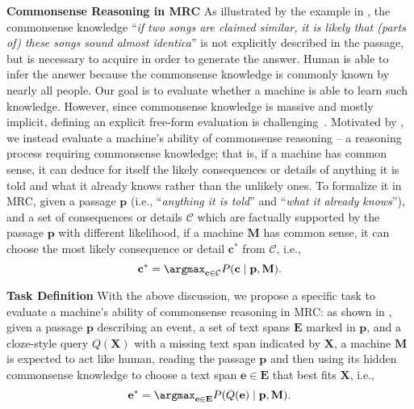 \noindent\textbf{Commonsense Reasoning in MRC}
As illustrated by the example in , the commonsense knowledge ``\emph{if two songs are claimed similar, it is likely that (parts of) these songs sound almost identica}'' is not explicitly described in the passage, but is necessary to acquire in order to generate the answer.
Human is able to infer the answer because the commonsense knowledge is commonly known by nearly all people.
Our goal is to evaluate whether a machine is able to learn such knowledge.
However, since commonsense knowledge is massive and mostly implicit, defining an explicit free-form evaluation is challenging~\cite{wsc}.
Motivated by , we instead evaluate a machine's ability of commonsense reasoning -- a reasoning process requiring commonsense knowledge; that is, if a machine has common sense, it can deduce for itself the likely consequences or details of anything it is told and what it already knows rather than the unlikely ones.
To formalize it in MRC, given a passage $\mathbf{p}$ (i.e., ``\emph{anything it is told}'' and ``\emph{what it already knows}''),
and a set of consequences or details $\mathcal{C}$ which are factually supported by the passage $\mathbf{p}$ with different likelihood,
if a machine $\mathbf{M}$ has common sense, it can choose the most likely consequence or detail $\mathbf{c}^*$ from $\mathcal{C}$, i.e., 
\begin{equation}
\label{eq:csr-in-mrc}
    \mathbf{c}^* = \argmax_{\mathbf{c} \in \mathcal{C}}P(\mathbf{c}\mid\mathbf{p},\mathbf{M}).
\end{equation}


\noindent\textbf{Task Definition} With the above discussion, we propose a specific task to evaluate a machine's ability of commonsense reasoning in MRC: as shown in , given a passage $\mathbf{p}$ describing an event, a set of text spans $\mathbf{E}$ marked in $\mathbf{p}$, and a cloze-style query $Q(\mathbf{X})$ with a missing text span indicated by $\mathbf{X}$,
a machine $\mathbf{M}$ is expected to act like human, reading the passage $\mathbf{p}$ and then using its hidden commonsense knowledge to choose a text span $\mathbf{e}\in\mathbf{E}$ that best fits $\mathbf{X}$, i.e., 
\begin{equation}
\label{eq:task}
    \mathbf{e}^* = \argmax_{\mathbf{e} \in \mathbf{E}}P(Q(\mathbf{e})\mid\mathbf{p},\mathbf{M}).
\end{equation}

